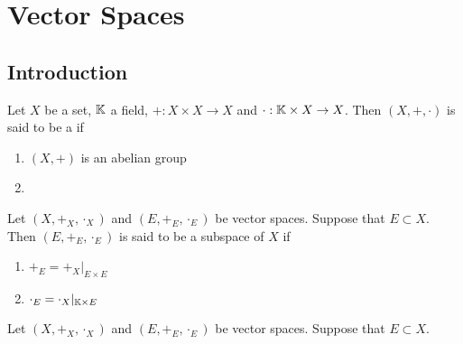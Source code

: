 \documentclass{book}
\begin{document}
 
 
 
 
 
 
 
 
 
 
 
 
 
 
 
 
 
 
 
 
 
 
 
 
 
 
 
 
 
 
 
 \newpage
 \chapter{Vector Spaces}
 
 \section{Introduction}
 
 \begin{defn}
 	Let $X$ be a set, $\mathbb{K}$ a field, $+:X \times X \rightarrow X$ and $\cdot:\mathbb{K} \times X \rightarrow X$. Then $(X, +, \cdot)$ is said to be a  if 
 	\begin{enumerate}
 		\item $(X, +)$ is an abelian group
 		\item 
 	\end{enumerate} 
 \end{defn}
 
 
 \begin{defn}
 	Let $(X, +_X, \cdot_X)$ and $(E, +_E, \cdot_E)$ be vector spaces. Suppose that $E \subset X$. Then $(E, +_E, \cdot_E)$ is said to be a subspace of $X$ if 
 	\begin{enumerate}
 		\item $+_E = +_X|_{E \times E}$
 		\item $\cdot_E = \cdot_X|_{\mathbb{K} \times E}$
 	\end{enumerate}
 \end{defn}
 
 \begin{ex}
 	Let $(X, +_X, \cdot_X)$ and $(E, +_E, \cdot_E)$ be vector spaces. Suppose that $E \subset X$. 
 \end{ex}
 
\end{document}
